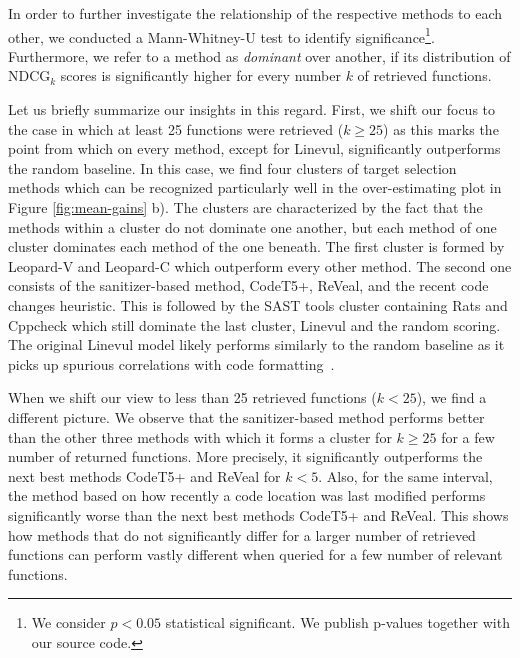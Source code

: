 In order to further investigate the relationship of the respective methods to each other, we conducted a Mann-Whitney-U test to identify significance\footnote{We consider $p < 0.05$ statistical significant. We publish p-values together with our source code.}. Furthermore, we refer to a method as \textit{dominant} over another, if its distribution of $\text{NDCG}_k$ scores is significantly higher for every number $k$ of retrieved functions.

\cstart
Let us briefly summarize our insights in this regard. First, we shift our focus to the case in which at least 25 functions were retrieved ($k \geq 25$) as this marks the point from which on every method, except for Linevul, significantly outperforms the random baseline. In this case, we find four clusters of target selection methods which can be recognized particularly well in the over-estimating plot in Figure \ref{fig:mean-gains} b). The clusters are characterized by the fact that the methods within a cluster do not dominate one another, but each method of one cluster dominates each method of the one beneath. The first cluster is formed by Leopard-V and Leopard-C which outperform every other method. The second one consists of the sanitizer-based method, CodeT5+, ReVeal, and the recent code changes heuristic. This is followed by the SAST tools cluster containing Rats and Cppcheck which still dominate the last cluster, Linevul and the random scoring. The original Linevul model likely performs similarly to the random baseline as it picks up spurious correlations with code formatting~\cite{brokenPromises}.

When we shift our view to less than 25 retrieved functions ($k < 25$), we find a different picture. We observe that the sanitizer-based method performs better than the other three methods with which it forms a cluster for $k \geq 25$ for a few number of returned functions. More precisely, it significantly outperforms the next best methods CodeT5+ and ReVeal for $k < 5$. Also, for the same interval, the method based on how recently a code location was last modified performs significantly worse than the next best methods CodeT5+ and ReVeal. This shows how methods that do not significantly differ for a larger number of retrieved functions can perform vastly different when queried for a few number of relevant functions.

